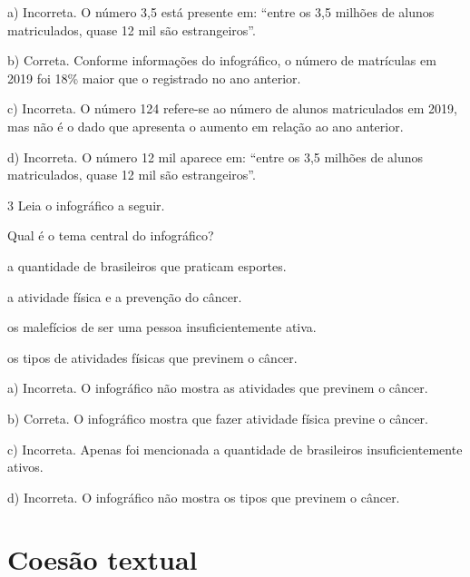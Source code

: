 \begin{escolha}
\begin{escolha}
a)  Incorreta. O número 3,5 está presente em: ``entre os 3,5 milhões de
alunos matriculados, quase 12 mil são estrangeiros''.

b)  Correta. Conforme informações do infográfico, o número de matrículas
em 2019 foi 18\% maior que o registrado no ano anterior.

c)  Incorreta. O número 124 refere-se ao número de alunos matriculados
em 2019, mas não é o dado que apresenta o aumento em relação ao ano
anterior.

d)  Incorreta. O número 12 mil aparece em: ``entre os 3,5 milhões de
alunos matriculados, quase 12 mil são estrangeiros''.

\num{3} Leia o infográfico a seguir.



Qual é o tema central do infográfico?

\begin{escolha}
\item a quantidade de brasileiros que praticam esportes.

\item a atividade física e a prevenção do câncer.

\item os malefícios de ser uma pessoa insuficientemente ativa.

\item os tipos de atividades físicas que previnem o câncer.
\end{escolha}


a)  Incorreta. O infográfico não mostra as atividades que previnem o
câncer.

b)  Correta. O infográfico mostra que fazer atividade física previne o
câncer.

c)  Incorreta. Apenas foi mencionada a quantidade de brasileiros
insuficientemente ativos.

d)  Incorreta. O infográfico não mostra os tipos que previnem o câncer.

\chapter{Coesão textual}


\end{escolha}
\end{escolha}
